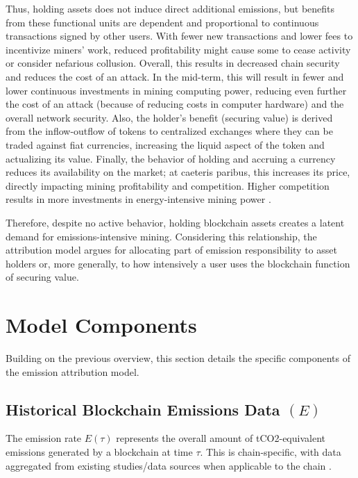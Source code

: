 \documentclass[11pt]{report}
\begin{document}
Thus, holding assets does not induce direct additional emissions, but benefits from these functional units are dependent and proportional to continuous transactions signed by other users. With fewer new transactions and lower fees to incentivize miners' work, reduced profitability might cause some to cease activity or consider nefarious collusion. Overall, this results in decreased chain security and reduces the cost of an attack.  In the mid-term, this will result in fewer and lower continuous investments in mining computing power, reducing even further the cost of an attack (because of reducing costs in computer hardware) and the overall network security. Also, the holder's benefit (securing value) is derived from the inflow-outflow of tokens to centralized exchanges where they can be traded against fiat currencies, increasing the liquid aspect of the token and actualizing its value. Finally, the behavior of holding and accruing a currency reduces its availability on the market; at caeteris paribus, this increases its price, directly impacting mining profitability and competition. Higher competition results in more investments in energy-intensive mining power  \cite{easleyMiningMarketsEvolution2019}.

Therefore, despite no active behavior, holding blockchain assets creates a latent demand for emissions-intensive mining. Considering this relationship, the attribution model argues for allocating part of emission responsibility to asset holders or, more generally, to how intensively a user uses the blockchain function of securing value.

\section{Model Components}

Building on the previous overview, this section details the specific components of the emission attribution model.

\subsection{Historical Blockchain Emissions Data $(E)$}
The emission rate \(E(\tau)\) represents the overall amount of tCO2-equivalent emissions generated by a blockchain at time $\tau$. This is chain-specific, with data aggregated from existing studies/data sources when applicable to the chain \cite{neumuellerCambridgeBitcoinElectricity2021,stollCarbonFootprintBitcoin2019}.
\end{document}
